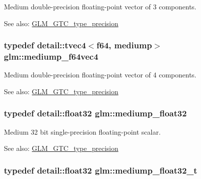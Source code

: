 Medium double-precision floating-point vector of 3 components. \begin{Desc}
\item[See also:]\hyperlink{group__gtc__type__precision}{GLM\_\-GTC\_\-type\_\-precision} \end{Desc}
\hypertarget{group__gtc__type__precision_g0e011facac062fd7fb9b40c7d8288310}{
\subsubsection[mediump\_\-f64vec4]{\setlength{\rightskip}{0pt plus 5cm}typedef detail::tvec4$<$f64, mediump$>$ {\bf glm::mediump\_\-f64vec4}}}
\label{group__gtc__type__precision_g0e011facac062fd7fb9b40c7d8288310}


Medium double-precision floating-point vector of 4 components. \begin{Desc}
\item[See also:]\hyperlink{group__gtc__type__precision}{GLM\_\-GTC\_\-type\_\-precision} \end{Desc}
\hypertarget{group__gtc__type__precision_g1b5f74cbeed0c9d42cd57d77609be7ee}{
\subsubsection[mediump\_\-float32]{\setlength{\rightskip}{0pt plus 5cm}typedef detail::float32 {\bf glm::mediump\_\-float32}}}
\label{group__gtc__type__precision_g1b5f74cbeed0c9d42cd57d77609be7ee}


Medium 32 bit single-precision floating-point scalar. \begin{Desc}
\item[See also:]\hyperlink{group__gtc__type__precision}{GLM\_\-GTC\_\-type\_\-precision} \end{Desc}
\hypertarget{group__gtc__type__precision_gcbd406715148db96c9d9d2a2ef6460de}{
\subsubsection[mediump\_\-float32\_\-t]{\setlength{\rightskip}{0pt plus 5cm}typedef detail::float32 {\bf glm::mediump\_\-float32\_\-t}}}
\label{group__gtc__type__precision_gcbd406715148db96c9d9d2a2ef6460de}


